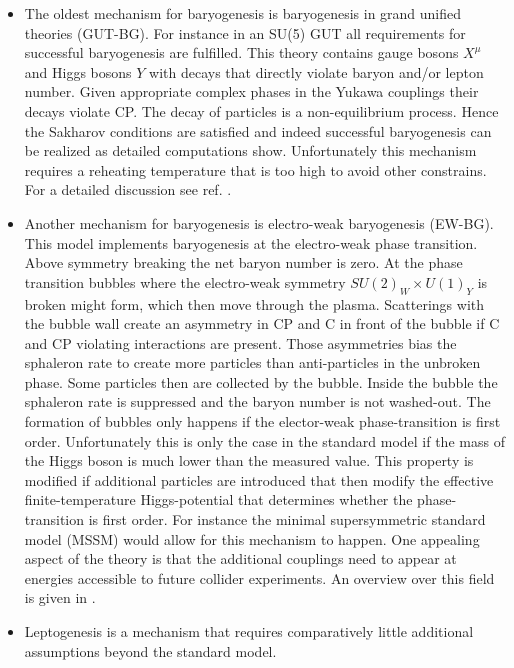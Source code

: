 \documentclass[13pt,a4paper,titlepage]{article}
\begin{document}
\begin{itemize}
    \item The oldest mechanism for baryogenesis is baryogenesis in grand unified theories (GUT-BG).
    For instance in an SU(5) GUT all requirements for successful baryogenesis are
    fulfilled. This theory contains gauge bosons $X^\mu$ and Higgs bosons $Y$ with decays that directly
    violate baryon and/or lepton number. Given appropriate complex phases in the Yukawa couplings
    their decays violate CP. The decay of particles is a non-equilibrium process. Hence the Sakharov conditions are satisfied and indeed successful baryogenesis can be realized as detailed computations show.
    Unfortunately this mechanism requires a reheating temperature that is too high to avoid other constrains. For a detailed discussion see ref. \cite[sec. 3]{Dine_2003_Bayrogenesis}.
    \item Another mechanism for baryogenesis is electro-weak baryogenesis (EW-BG).
    This model implements baryogenesis at the electro-weak phase transition.
    Above symmetry breaking the net baryon number is zero.
    At the phase transition bubbles where the electro-weak symmetry $SU(2)_W \times U(1)_Y$ is broken might form, which then
    move through the plasma.
    Scatterings with the bubble wall create an asymmetry in CP and C in front of the bubble if C and CP violating interactions are present.
    Those asymmetries bias the sphaleron rate to create more particles than anti-particles in the unbroken phase.
    Some particles then are collected by the bubble. Inside the bubble the sphaleron rate is suppressed and the
    baryon number is not washed-out.
    The formation of bubbles only happens if the elector-weak phase-transition is first order.
    Unfortunately this is only the case in the standard model if the mass of the Higgs boson is much lower than
    the measured value.
    This property is modified if additional particles are introduced that then modify the effective finite-temperature
    Higgs-potential that determines whether the phase-transition is first order.
    For instance the minimal supersymmetric standard model (MSSM) would allow for this mechanism to happen.
    One appealing aspect of the theory is that the additional couplings need to appear at energies accessible to future collider
    experiments. An overview over this field is given in \cite{Electroweak_baryogenesis_Morrissey_2012}.
    \item Leptogenesis is a mechanism that requires comparatively little additional assumptions beyond the standard model.

\end{itemize}
\end{document}
